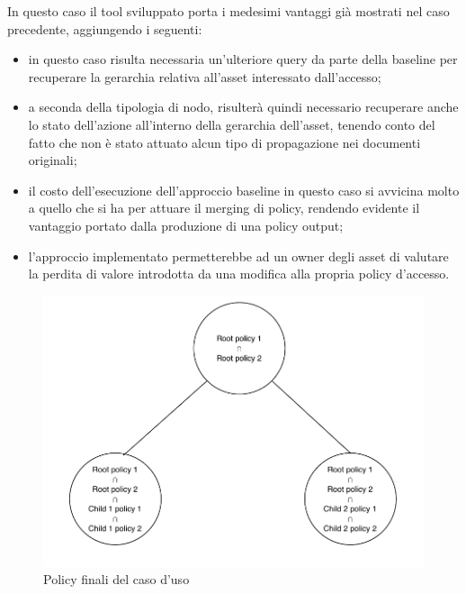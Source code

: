 \documentclass[12pt,a4paper,twoside]{book}
\begin{document}
In questo caso il tool sviluppato porta i medesimi vantaggi già mostrati nel caso precedente, aggiungendo i seguenti:
\begin{itemize}
\item in questo caso risulta necessaria un'ulteriore query da parte della baseline per recuperare la gerarchia relativa all'asset interessato dall'accesso;
\item a seconda della tipologia di nodo, risulterà quindi necessario recuperare anche lo stato dell'azione all'interno della gerarchia dell'asset, tenendo conto del fatto che non è stato attuato alcun tipo di propagazione nei documenti originali;
\item il costo dell'esecuzione dell'approccio baseline in questo caso si avvicina molto a quello che si ha per attuare il merging di policy, rendendo evidente il vantaggio portato dalla produzione di una policy output;
\item l'approccio implementato permetterebbe ad un owner degli asset di valutare la perdita di valore introdotta da una modifica alla propria policy d'accesso.
\end{itemize}
\begin{figure}[H]
\centering
\includegraphics[scale=.50]{../immagini/treePolicyExample.pdf}
\caption{Policy finali del caso d'uso}
\label{treeExampleImg}
\end{figure}
\end{document}
